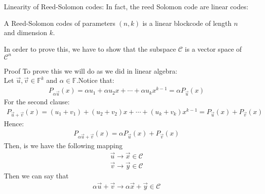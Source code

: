 \begin{parag}{Linearity of Reed-Solomon codes:}
    In fact, the reed Solomon code are linear codes:
    \begin{theoreme}
        A Reed-Solomon codes of parameters $\left(n, k\right)$ is a linear blockcode of length $n$ and dimension $k$.
    \end{theoreme}
    
    \begin{framedremark}
    In order to prove this, we have to show that the subspace $\mathcal{C}$ is a vector space of $\mathcal{C}^n$
    \end{framedremark}
    \begin{subparag}{Proof}
        To prove this we will do as we did in linear algebra:\\
            Let $\vec{u}, \vec{v} \in \mathbb{F}^k$ and $\alpha \in \mathbb{F}$.Notice that:
            \begin{align*} 
                P_{\alpha \vec{u}}\left(x\right) =  \alpha u_1 + \alpha u_2x + \cdots + \alpha u_kx^{k-1}= \alpha P_{\vec{u}}\left(x\right)
            \end{align*}
            For the second clause:
            \begin{align*} 
                P_{\vec{u} + \vec{v}}\left(x\right) = \left(u_1 + v_1\right) + \left(u_2 + v_2\right)x + \cdots + \left(u_k + v_k\right)x^{k-1} = P_{\vec{u}}\left(x\right) + P_{\vec{v}}\left(x\right)
            \end{align*}
            Hence:
            \begin{align*} 
                P_{\alpha \vec{u} + \vec{v}}\left(x\right) =  \alpha P_{\vec{u}}\left(x\right) + P_{\vec{v}}\left(x\right)
            \end{align*}
            Then, is we have the following mapping
            \begin{align*} 
                \vec{u} \to \vec{x}  \in \mathcal{C}\\
                \vec{v} \to \vec{y} \in \mathcal{C}
            \end{align*}
            Then we can say that 
            \begin{align*} \alpha \vec{u} + \vec{v} \to \alpha \vec{x} + \vec{y} \in \mathcal{C} \end{align*}
    \end{subparag}
\end{parag}
